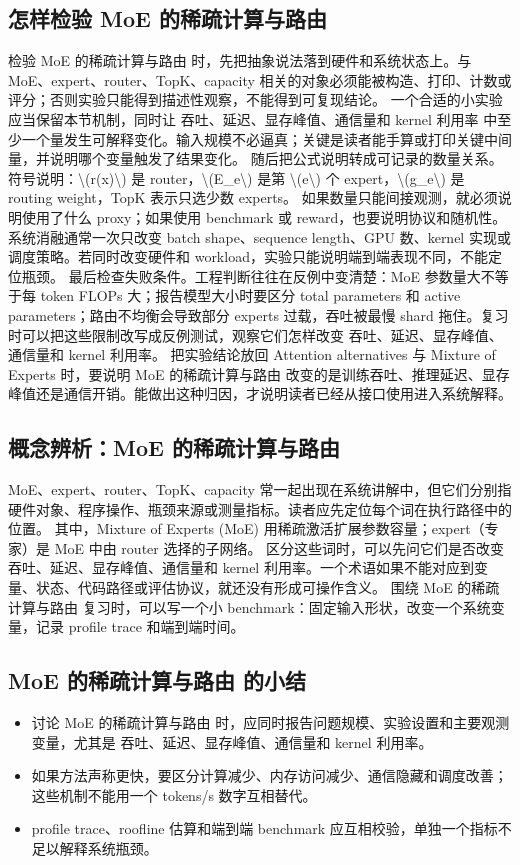 \documentclass[a4paper]{article}
\begin{document}
\subsection{怎样检验 MoE 的稀疏计算与路由}
检验 MoE 的稀疏计算与路由 时，先把抽象说法落到硬件和系统状态上。与 MoE、expert、router、TopK、capacity 相关的对象必须能被构造、打印、计数或评分；否则实验只能得到描述性观察，不能得到可复现结论。
一个合适的小实验应当保留本节机制，同时让 吞吐、延迟、显存峰值、通信量和 kernel 利用率 中至少一个量发生可解释变化。输入规模不必逼真；关键是读者能手算或打印关键中间量，并说明哪个变量触发了结果变化。
随后把公式说明转成可记录的数量关系。符号说明：\textbackslash{}(r(x)\textbackslash{}) 是 router，\textbackslash{}(E\_e\textbackslash{}) 是第 \textbackslash{}(e\textbackslash{}) 个 expert，\textbackslash{}(g\_e\textbackslash{}) 是 routing weight，TopK 表示只选少数 experts。 如果数量只能间接观测，就必须说明使用了什么 proxy；如果使用 benchmark 或 reward，也要说明协议和随机性。
系统消融通常一次只改变 batch shape、sequence length、GPU 数、kernel 实现或调度策略。若同时改变硬件和 workload，实验只能说明端到端表现不同，不能定位瓶颈。
最后检查失败条件。工程判断往往在反例中变清楚：MoE 参数量大不等于每 token FLOPs 大；报告模型大小时要区分 total parameters 和 active parameters；路由不均衡会导致部分 experts 过载，吞吐被最慢 shard 拖住。复习时可以把这些限制改写成反例测试，观察它们怎样改变 吞吐、延迟、显存峰值、通信量和 kernel 利用率。
把实验结论放回 Attention alternatives 与 Mixture of Experts 时，要说明 MoE 的稀疏计算与路由 改变的是训练吞吐、推理延迟、显存峰值还是通信开销。能做出这种归因，才说明读者已经从接口使用进入系统解释。
\subsection{概念辨析：MoE 的稀疏计算与路由}
MoE、expert、router、TopK、capacity 常一起出现在系统讲解中，但它们分别指硬件对象、程序操作、瓶颈来源或测量指标。读者应先定位每个词在执行路径中的位置。
其中，Mixture of Experts (MoE) 用稀疏激活扩展参数容量；expert（专家）是 MoE 中由 router 选择的子网络。
区分这些词时，可以先问它们是否改变 吞吐、延迟、显存峰值、通信量和 kernel 利用率。一个术语如果不能对应到变量、状态、代码路径或评估协议，就还没有形成可操作含义。
围绕 MoE 的稀疏计算与路由 复习时，可以写一个小 benchmark：固定输入形状，改变一个系统变量，记录 profile trace 和端到端时间。
\subsection{MoE 的稀疏计算与路由 的小结}
\begin{itemize}
\item 讨论 MoE 的稀疏计算与路由 时，应同时报告问题规模、实验设置和主要观测变量，尤其是 吞吐、延迟、显存峰值、通信量和 kernel 利用率。
\item 如果方法声称更快，要区分计算减少、内存访问减少、通信隐藏和调度改善；这些机制不能用一个 tokens/s 数字互相替代。
\item profile trace、roofline 估算和端到端 benchmark 应互相校验，单独一个指标不足以解释系统瓶颈。
\end{itemize}
\end{document}
